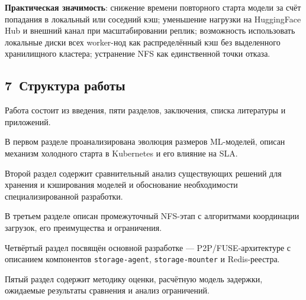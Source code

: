 \textbf{Практическая значимость}: снижение времени повторного старта модели за счёт попадания в локальный или соседний кэш; уменьшение нагрузки на HuggingFace Hub и внешний канал при масштабировании реплик; возможность использовать локальные диски всех worker-нод как распределённый кэш без выделенного хранилищного кластера; устранение NFS как единственной точки отказа.

\subsection*{7~Структура работы}

Работа состоит из введения, пяти разделов, заключения, списка литературы и приложений.

В первом разделе проанализирована эволюция размеров ML-моделей, описан механизм холодного старта в Kubernetes и его влияние на SLA.

Второй раздел содержит сравнительный анализ существующих решений для хранения и кэширования моделей и обоснование необходимости специализированной разработки.

В третьем разделе описан промежуточный NFS-этап с алгоритмами координации загрузок, его преимущества и ограничения.

Четвёртый раздел посвящён основной разработке --- P2P/FUSE-архитектуре с описанием компонентов \texttt{storage-agent}, \texttt{storage-mounter} и Redis-реестра.

Пятый раздел содержит методику оценки, расчётную модель задержки, ожидаемые результаты сравнения и анализ ограничений.
